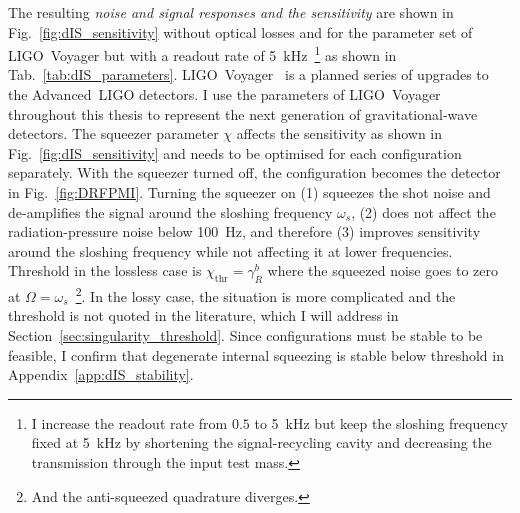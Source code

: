 The resulting \emph{noise and signal responses and the sensitivity} are shown in Fig.~\ref{fig:dIS_sensitivity} without optical losses and for the parameter set of LIGO~Voyager but with a readout rate of 5~kHz~\footnote{I increase the readout rate from $0.5$ to 5~kHz but keep the sloshing frequency fixed at 5~kHz by shortening the signal-recycling cavity and decreasing the transmission through the input test mass.} as shown in Tab.~\ref{tab:dIS_parameters}.
LIGO~Voyager~\cite{LIGO_Voyager} is a planned series of upgrades to the Advanced~LIGO detectors. I use the parameters of LIGO~Voyager throughout this thesis to represent the next generation of gravitational-wave detectors. %
The squeezer parameter $\chi$ affects the sensitivity as shown in Fig.~\ref{fig:dIS_sensitivity} and needs to be optimised for each configuration separately. With the squeezer turned off, the configuration becomes the detector in Fig.~\ref{fig:DRFPMI}. %
Turning the squeezer on (1) squeezes the shot noise and de-amplifies the signal around the sloshing frequency $\omega_s$, (2) does not affect the radiation-pressure noise below 100~Hz, and therefore (3) improves sensitivity around the sloshing frequency while not affecting it at lower frequencies. 
Threshold in the lossless case is $\chi_\text{thr}=\gamma^b_R$ where the squeezed noise goes to zero at $\Omega=\omega_s$~\footnote{And the anti-squeezed quadrature diverges.}. In the lossy case, the situation is more complicated and the threshold is not quoted in the literature, which I will address in Section~\ref{sec:singularity_threshold}. Since configurations must be stable to be feasible, I confirm that degenerate internal squeezing is stable below threshold in Appendix~\ref{app:dIS_stability}.
